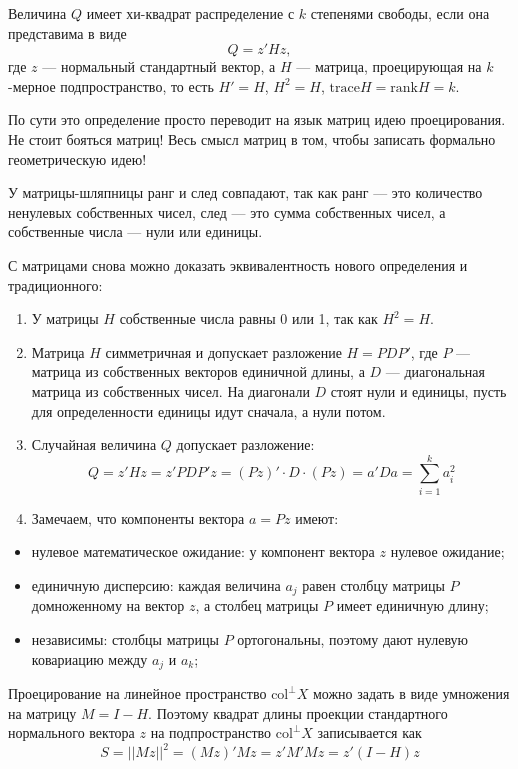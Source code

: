 \documentclass[11pt,russian,]{article}
\providecommand{\tightlist}{%
  \setlength{\itemsep}{0pt}\setlength{\parskip}{0pt}}
\newcommand{\1}{\mathbbm{1}}
\newcommand{\col}{\mathcal{col}}
\newcommand{\colp}{\col^{\perp}}
\renewcommand{\col}{\mathrm{col}}
\newcommand{\trace}{\mathrm{trace}}
\newcommand{\rank}{\mathrm{rank}}
\begin{document}
Величина \(Q\) имеет хи-квадрат распределение с \(k\) степенями свободы,
если она представима в виде \[
Q = z'Hz,
\] где \(z\) --- нормальный стандартный вектор, а \(H\) --- матрица,
проецирующая на \(k\)-мерное подпространство, то есть \(H'=H\),
\(H^2=H\), \(\trace H =\rank H= k\).

По сути это определение просто переводит на язык матриц идею
проецирования. Не стоит бояться матриц! Весь смысл матриц в том, чтобы
записать формально геометрическую идею!

У матрицы-шляпницы ранг и след совпадают, так как ранг --- это
количество ненулевых собственных чисел, след --- это сумма собственных
чисел, а собственные числа --- нули или единицы.

С матрицами снова можно доказать эквивалентность нового определения и
традиционного:

\begin{enumerate}
\def\labelenumi{\arabic{enumi}.}
\item
  У матрицы \(H\) собственные числа равны 0 или 1, так как \(H^2=H\).
\item
  Матрица \(H\) симметричная и допускает разложение \(H = PDP'\), где
  \(P\) --- матрица из собственных векторов единичной длины, а \(D\) ---
  диагональная матрица из собственных чисел. На диагонали \(D\) стоят
  нули и единицы, пусть для определенности единицы идут сначала, а нули
  потом.
\item
  Случайная величина \(Q\) допускает разложение: \[
  Q=z'Hz=z'PDP'z=(Pz)'\cdot D\cdot (Pz) = a'Da=\sum_{i=1}^k a_i^2
  \]
\item
  Замечаем, что компоненты вектора \(a=Pz\) имеют:
\end{enumerate}

\begin{itemize}
\tightlist
\item
  нулевое математическое ожидание: у компонент вектора \(z\) нулевое
  ожидание;
\item
  единичную дисперсию: каждая величина \(a_j\) равен столбцу матрицы
  \(P\) домноженному на вектор \(z\), а столбец матрицы \(P\) имеет
  единичную длину;
\item
  независимы: столбцы матрицы \(P\) ортогональны, поэтому дают нулевую
  ковариацию между \(a_j\) и \(a_k\);
\end{itemize}

Проецирование на линейное пространство \(\colp X\) можно задать в виде
умножения на матрицу \(M = I - H\). Поэтому квадрат длины проекции
стандартного нормального вектора \(z\) на подпространство \(\colp X\)
записывается как \[
S = ||Mz||^2 = (Mz)'Mz=z'M'Mz=z'(I-H)z
\]
\end{document}

